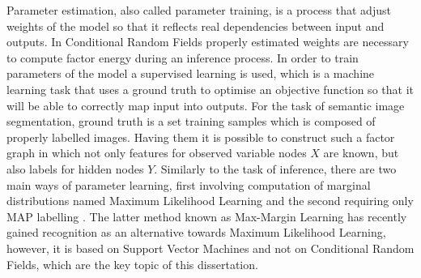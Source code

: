 Parameter estimation, also called parameter training, is a process that adjust weights of the model so that it reflects real dependencies between input and outputs. In Conditional Random Fields properly estimated weights are necessary to compute factor energy during an inference process. In order to train parameters of the model a supervised learning is used, which is a machine learning task that uses a ground truth to optimise an objective function so that it will be able to correctly map input into outputs. For the task of semantic image segmentation, ground truth is a set training samples which is composed of properly labelled images. Having them it is possible to construct such a factor graph in which not only features for observed variable nodes $X$ are known, but also labels for hidden nodes $Y$. Similarly to the task of inference, there are two main ways of parameter learning, first involving computation of marginal distributions named Maximum Likelihood Learning and the second requiring only MAP labelling \cite{markov_blake}. The latter method known as Max-Margin Learning has recently gained recognition as an alternative towards Maximum Likelihood Learning, however, it is based on Support Vector Machines and not on Conditional Random Fields, which are the key topic of this dissertation. 

